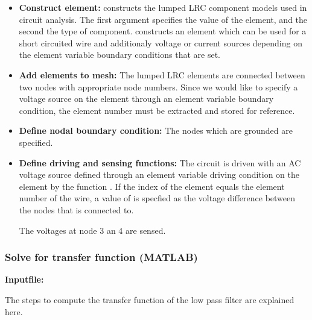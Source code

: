 \begin{itemize}

  \item{\textbf{Construct element:}}
   constructs the lumped LRC component
  models used in circuit analysis. The first argument specifies
  the value of the element, and the second the type of component.
   constructs an element which 
  can be used for a short circuited wire and additionaly 
  voltage or current sources depending on the element variable 
  boundary conditions that are set.

  \item{\textbf{Add elements to mesh:}}
  The lumped LRC elements are connected between two nodes
  with appropriate node numbers. Since we would like to specify
  a voltage source on the  element through an element
  variable boundary condition, the element number 
  must be extracted and stored for reference.

  \item{\textbf{Define nodal boundary condition:}}
  The nodes which are grounded are specified.

  \item{\textbf{Define driving and sensing functions:}}
  The circuit is driven with an AC voltage source defined 
  through an element variable driving condition on the 
   element by the function . 
  If the index of the
  element  equals the element number  of
  the wire, a value of  is specfied as the voltage
  difference between the nodes that  is connected to. 

  The voltages at node 3 an 4 are sensed. 

\end{itemize}

\clearpage
\subsubsection*{Solve for transfer function (MATLAB)}
\begin{flushleft}
  \textbf{Inputfile:}
  \\
\end{flushleft}
\hspace{1in}
{\footnotesize
{}
}

\clearpage
The steps to compute the transfer function of the low pass
filter are explained here. 

